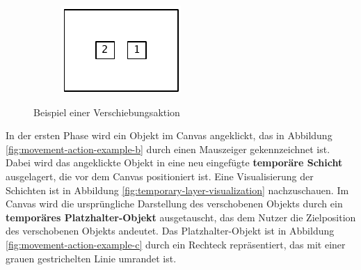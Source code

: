 \begin{figure}[hbt]
\begin{subfigure}{\subfigurewidth}
        \caption{}
        \label{fig:movement-action-example-d}
    \end{subfigure}
    \begin{subfigure}{\subfigurewidth}
        \centering
        \includegraphics[scale=\graphicsscale]{resources/movement-action-example-e}
        \caption{}
        \label{fig:movement-action-example-e}
    \end{subfigure}
    \caption{Beispiel einer Verschiebungsaktion}
    \label{fig:movement-action-example}
\end{figure}

In der ersten Phase wird ein Objekt im Canvas angeklickt, das in Abbildung \ref{fig:movement-action-example-b} durch einen Mauszeiger gekennzeichnet ist. Dabei wird das angeklickte Objekt in eine neu eingefügte \textbf{temporäre Schicht} ausgelagert, die vor dem Canvas positioniert ist. Eine Visualisierung der Schichten ist in Abbildung \ref{fig:temporary-layer-visualization} nachzuschauen. Im Canvas wird die ursprüngliche Darstellung des verschobenen Objekts durch ein \textbf{temporäres Platzhalter-Objekt} ausgetauscht, das dem Nutzer die Zielposition des verschobenen Objekts andeutet. Das Platzhalter-Objekt ist in Abbildung \ref{fig:movement-action-example-c} durch ein Rechteck repräsentiert, das mit einer grauen gestrichelten Linie umrandet ist.

